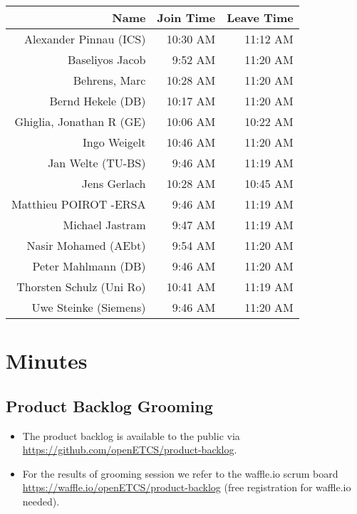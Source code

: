 \documentclass[a4paper, 11pt]{article}
\begin{document}
\begin{table}[htbp]
    \begin{tabular}{rrr}
    \toprule
    \textbf{Name} & \textbf{Join Time} & \textbf{Leave Time} \\
    \midrule
    Alexander Pinnau (ICS) & 10:30 AM & 11:12 AM \\
    Baseliyos Jacob & 9:52 AM & 11:20 AM \\
    Behrens, Marc & 10:28 AM & 11:20 AM \\
    Bernd Hekele (DB) & 10:17 AM & 11:20 AM \\
    Ghiglia, Jonathan R (GE) & 10:06 AM & 10:22 AM \\
    Ingo Weigelt & 10:46 AM & 11:20 AM \\
    Jan Welte (TU-BS) & 9:46 AM & 11:19 AM \\
    Jens Gerlach & 10:28 AM & 10:45 AM \\
    Matthieu POIROT -ERSA & 9:46 AM & 11:19 AM \\
    Michael Jastram & 9:47 AM & 11:19 AM \\
    Nasir Mohamed (AEbt) & 9:54 AM & 11:20 AM \\
    Peter Mahlmann (DB) & 9:46 AM & 11:20 AM \\
    Thorsten Schulz (Uni Ro) & 10:41 AM & 11:19 AM \\
    Uwe Steinke (Siemens) & 9:46 AM & 11:20 AM \\
    \bottomrule
    \end{tabular}%
  \label{tab:addlabel}%
\end{table}%


\section{Minutes}

\subsection{Product Backlog Grooming}
\begin{itemize}
\item The product backlog is available to the public via 
\url{https://github.com/openETCS/product-backlog}. 
\item For the results of grooming session we refer to the waffle.io scrum board \url{https://waffle.io/openETCS/product-backlog} (free registration for waffle.io needed).
\end{itemize}
\end{document}
